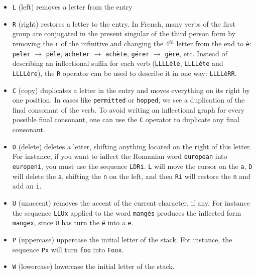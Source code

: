 \begin{itemize}
  \item \verb+L+ (left) removes a letter from the entry
  
  \item \verb+R+ (right) restores a letter to the entry. In French, many verbs
  of the first group are conjugated in the present singular  of the third person form  by removing the
  \verb+r+ of the infinitive and changing the 4$^{th}$ letter from the end to
  \texttt{\`e}: \verb+peler+ $\rightarrow$ \texttt{p\`ele},
  \verb+acheter+ $\rightarrow$ \texttt{ach\`ete}, \texttt{g\'erer}
  $\rightarrow$ \texttt{g\`ere}, etc. Instead of describing an inflectional
  suffix for each verb (\texttt{LLLL\`ele}, \texttt{LLLL\`ete} and
  \texttt{LLLL\`ere}), the \verb+R+ operator can be used to
  describe it in one way: \texttt{LLLL\`eRR}.
  
  \item \verb+C+ (copy) duplicates a letter in the entry and moves everything on
  its right by one position. In cases like \verb+permitted+ or \verb+hopped+, we
  see a duplication of the final consonant of the verb. To avoid writing an
  inflectional graph for every possible final consonant, one can use the \verb+C+
  operator to duplicate any final consonant.
  
  \item \verb+D+ (delete) deletes a
  letter, shifting anything located on the right of this letter. For instance, if
  you want to inflect the Romanian word \verb+european+ into \verb+europeni+, you
  must use the sequence \verb+LDRi+. \verb+L+ will move the cursor on the
  \verb+a+, \verb+D+ will delete the \verb+a+, shifting the \verb+n+ on the left,
  and then \verb+Ri+ will restore the \verb+n+ and add an \verb+i+.

  \item \verb+U+ (unaccent) removes the accent of the current character, if
  any. For instance the sequence \verb+LLUx+ applied to the word
  \texttt{mang\'es} produces the inflected form \verb+mangex+, since \verb+U+
  has turn the \texttt{\'e} into a \verb+e+.

  \item \verb+P+ (uppercase) uppercase the initial letter of the stack. For
  instance, the sequence \verb$Px$ will turn \verb$foo$ into \verb$Foox$.
  
  \item \verb+W+ (lowercase) lowercase the initial letter of the stack.
   
\end{itemize}

